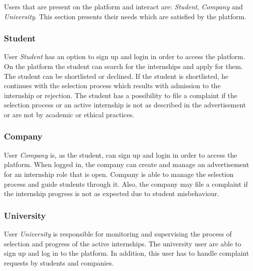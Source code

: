 Users that are present on the platform and interact are: \textit{Student}, \textit{Company} and \textit{University}. This section presents their needs which are satisfied by the platform.



\subsubsection{Student}
User \textit{Student} has an option to sign up and login in order to access the platform. On the platform the student can search for the internships and apply for them. The student can be shortlisted or declined. If the student is shortlisted, he continues with the selection process which results with admission to the internship or rejection. The student has a possibility to file a complaint if the selection process or an active internship is not as described in the advertisement or are not by academic or ethical practices.


\subsubsection{Company}

User \textit{Company} is, as the student, can sign up and login in order to access the platform. When logged in, the company can create and manage an advertisement for an internship role that is open. Company is able to manage the selection process and guide students through it. Also, the company may file a complaint if the internship progress is not as expected due to student misbehaviour. 



\subsubsection{University}
User \textit{University} is responsible for monitoring and supervising the process of selection and progress of the active internships. The university user are able to sign up and log in to the platform. In addition, this user has to handle complaint requests by students and companies. 

